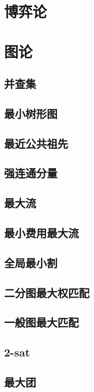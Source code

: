 \documentclass{article}
\begin{document}
\section{博弈论}


\section{图论}
\subsection{并查集}

\subsection{最小树形图}

\subsection{最近公共祖先}

\subsection{强连通分量}

\subsection{最大流}

\subsection{最小费用最大流}

\subsection{全局最小割}

\subsection{二分图最大权匹配}

\subsection{一般图最大匹配}

\subsection{2-sat}
\subsection{最大团}

\end{document}

